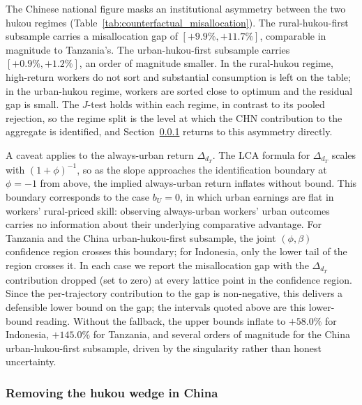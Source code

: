 The Chinese national figure masks an institutional asymmetry between the two hukou regimes (Table~\ref{tab:counterfactual_misallocation}).
The rural-hukou-first subsample carries a misallocation gap of $[+9.9\%, +11.7\%]$, comparable in magnitude to Tanzania's.
The urban-hukou-first subsample carries $[+0.9\%, +1.2\%]$, an order of magnitude smaller.
In the rural-hukou regime, high-return workers do not sort and substantial consumption is left on the table; in the urban-hukou regime, workers are sorted close to optimum and the residual gap is small.
The $J$-test holds within each regime, in contrast to its pooled rejection, so the regime split is the level at which the CHN contribution to the aggregate is identified, and Section~\ref{sec:hukou-counterfactual} returns to this asymmetry directly.



A caveat applies to the always-urban return $\Delta_{d_T}$.
The LCA formula for $\Delta_{d_T}$ scales with $(1+\phi)^{-1}$, so as the slope approaches the identification boundary at $\phi = -1$ from above, the implied always-urban return inflates without bound.
This boundary corresponds to the case $b_U = 0$, in which urban earnings are flat in workers' rural-priced skill: observing always-urban workers' urban outcomes carries no information about their underlying comparative advantage.
For Tanzania and the China urban-hukou-first subsample, the joint $(\phi, \beta)$ confidence region crosses this boundary; for Indonesia, only the lower tail of the region crosses it.
In each case we report the misallocation gap with the $\Delta_{d_T}$ contribution dropped (set to zero) at every lattice point in the confidence region.
Since the per-trajectory contribution to the gap is non-negative, this delivers a defensible lower bound on the gap; the intervals quoted above are this lower-bound reading.
Without the fallback, the upper bounds inflate to $+58.0\%$ for Indonesia, $+145.0\%$ for Tanzania, and several orders of magnitude for the China urban-hukou-first subsample, driven by the singularity rather than honest uncertainty.

\subsubsection{Removing the hukou wedge in China}\label{sec:hukou-counterfactual}

